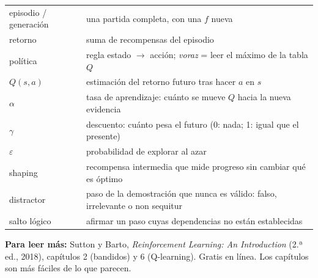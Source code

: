 \begin{tabularx}{\linewidth}{@{}l X@{}}
\toprule
episodio / generación & una partida completa, con una $f$ nueva \\
retorno & suma de recompensas del episodio \\
política & regla estado $\to$ acción; \emph{voraz} = leer el máximo de la tabla $Q$ \\
$Q(s,a)$ & estimación del retorno futuro tras hacer $a$ en $s$ \\
$\alpha$ & tasa de aprendizaje: cuánto se mueve $Q$ hacia la nueva evidencia \\
$\gamma$ & descuento: cuánto pesa el futuro (0: nada; 1: igual que el presente) \\
$\varepsilon$ & probabilidad de explorar al azar \\
shaping & recompensa intermedia que mide progreso sin cambiar qué es óptimo \\
distractor & paso de la demostración que nunca es válido: falso, irrelevante o non sequitur \\
salto lógico & afirmar un paso cuyas dependencias no están establecidas \\
\bottomrule
\end{tabularx}

\vspace{6pt}
\textbf{Para leer más:} Sutton y Barto, \emph{Reinforcement Learning: An Introduction} (2.ª ed., 2018), capítulos 2 (bandidos) y 6 (Q-learning). Gratis en línea. Los capítulos son más fáciles de lo que parecen.

